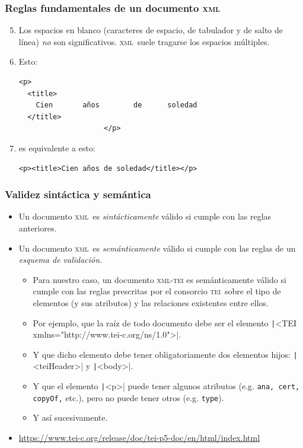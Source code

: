 \documentclass[%
  handout, %
  ]{beamer}
\newcommand*{\rojoit}[1]{\textit{\textcolor[HTML]{8B0000}{#1}}}
\newcommand*{\azul}[1]{\textcolor{bluenivaca}{#1}}
\newcommand*{\TEI}{\textsc{tei}}
\newcommand*{\XML}{\textsc{xml}}
\begin{document}
\begin{frame}[fragile]
  \frametitle{Reglas fundamentales de un documento \XML}
  \begin{enumerate}
      \setcounter{enumi}{4}
    \item Los espacios en blanco (caracteres de espacio, de tabulador y de salto de línea) \textit{no} son significativos. \XML\ suele tragarse los espacios múltiples.

      \medskip
      
    \item[] Esto:
\begin{verbatim}
<p>
  <title>
    Cien       años        de      soledad
  </title>
                    </p>
\end{verbatim}

      \bigskip

    \item[] es equivalente a esto:
\small
\begin{verbatim}
<p><title>Cien años de soledad</title></p>
\end{verbatim}      

      
  \end{enumerate}
\end{frame}


\begin{frame}[fragile]
  \frametitle{Validez sintáctica y semántica}
  \begin{itemize}
    \item Un documento \XML\ es \rojoit{sintácticamente} válido si cumple con las reglas anteriores.
    \item Un documento \XML\ es \rojoit{semánticamente} válido si cumple con las reglas de un \textit{esquema de validación}.
      
      \begin{itemize}
        \item Para nuestro caso, un documento \azul{\XML-\TEI} es semánticamente válido si cumple con las reglas prescritas por el consorcio \TEI\ sobre el tipo de elementos (y sus atributos) y las relaciones existentes entre ellos.
        \item Por ejemplo, que la raíz de todo documento debe ser el elemento \texttt|<TEI xmlns="http://www.tei-c.org/ns/1.0">|.
        \item Y que dicho elemento debe tener obligatoriamente dos elementos hijos: \texttt|<teiHeader>| y \texttt|<body>|.
        \item Y que el elemento \texttt|<p>| puede tener algunos atributos (e.g. \texttt{ana, cert, copyOf,} etc.), pero no puede tener otros (e.g. \texttt{type}).
        \item Y así sucesivamente.
      \end{itemize}
      
    \item[] \url{https://www.tei-c.org/release/doc/tei-p5-doc/en/html/index.html}
  \end{itemize}
\end{frame}
\end{document}
